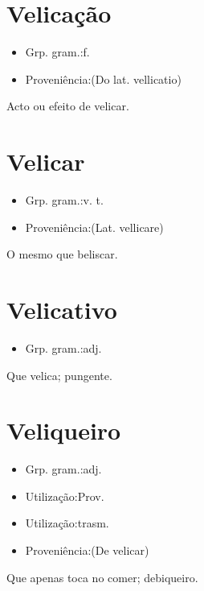 \documentclass{article}
\begin{document}
\section{Velicação}
\begin{itemize}
\item {Grp. gram.:f.}
\end{itemize}
\begin{itemize}
\item {Proveniência:(Do lat. \textunderscore vellicatio\textunderscore )}
\end{itemize}
Acto ou efeito de velicar.
\section{Velicar}
\begin{itemize}
\item {Grp. gram.:v. t.}
\end{itemize}
\begin{itemize}
\item {Proveniência:(Lat. \textunderscore vellicare\textunderscore )}
\end{itemize}
O mesmo que \textunderscore beliscar\textunderscore .
\section{Velicativo}
\begin{itemize}
\item {Grp. gram.:adj.}
\end{itemize}
Que velica; pungente.
\section{Veliqueiro}
\begin{itemize}
\item {Grp. gram.:adj.}
\end{itemize}
\begin{itemize}
\item {Utilização:Prov.}
\end{itemize}
\begin{itemize}
\item {Utilização:trasm.}
\end{itemize}
\begin{itemize}
\item {Proveniência:(De \textunderscore velicar\textunderscore )}
\end{itemize}
Que apenas toca no comer; debiqueiro.
\end{document}

